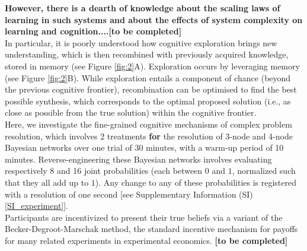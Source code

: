{\bf However, there is a dearth of knowledge about the scaling laws of learning in such systems and about the effects of system complexity on learning and cognition....[to be completed]}\\

In particular, it is poorly understood how cognitive exploration brings new understanding, which is then recombined with previously acquired knowledge, stored in memory (see Figure \ref{fig:2}A). Exploration occurs by leveraging memory (see Figure \ref{fig:2}B). While exploration entails a component of chance (beyond the previous cognitive frontier), recombination can be optimised to find the best possible synthesis, which corresponds to the optimal proposed solution (i.e., as close as possible from the true solution) within the cognitive frontier.\\

Here, we investigate the fine-grained cognitive mechanisms of complex problem resolution, which involves 2 treatments {\bf for} the resolution of 3-node and 4-node Bayesian networks over one trial of 30 minutes, with a warm-up period of 10 minutes. Reverse-engineering these Bayesian networks involves evaluating respectively 8 and 16 joint probabilities (each between $0$ and $1$, normalized such that they all add up to $1$). Any change to any of these probabilities is registered with a resolution of one second [see Supplementary Information (SI) \ref{SI_experiment}].\\

Participants are incentivized to present their true beliefs via a variant of the Becker-Degroot-Marschak method, the standard incentive mechanism for payoffs for many related experiments in experimental economics. {\bf [to be completed]}\\

